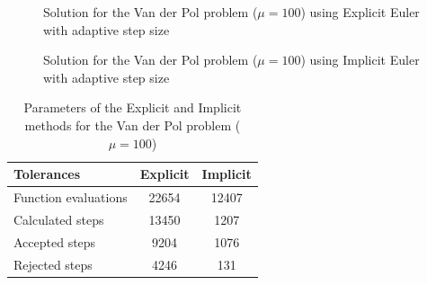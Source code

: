 \begin{figure}[H]
    \centering
    \caption{Solution for the Van der Pol problem ($\mathit{\mu = 100}$) using Explicit Euler with adaptive step size}
    \label{3_7_explicit}
\end{figure}

\begin{figure}[H]
    \centering
    \caption{Solution for the Van der Pol problem ($\mathit{\mu = 100}$) using Implicit Euler with adaptive step size}
    \label{3_7_implicit}
\end{figure}

\begin{table}[H]
\centering
\begin{tabular}{@{}l|cc@{}}
\toprule
Tolerances           & Explicit & Implicit \\ \midrule
Function evaluations & 22654    & 12407    \\
Calculated steps     & 13450    & 1207     \\
Accepted steps       & 9204     & 1076     \\
Rejected steps       & 4246     & 131      \\ \bottomrule
\end{tabular}
\caption{Parameters of the Explicit and Implicit methods for the Van der Pol problem ($\mu = 100$)}
\label{3_7_table}
\end{table}
